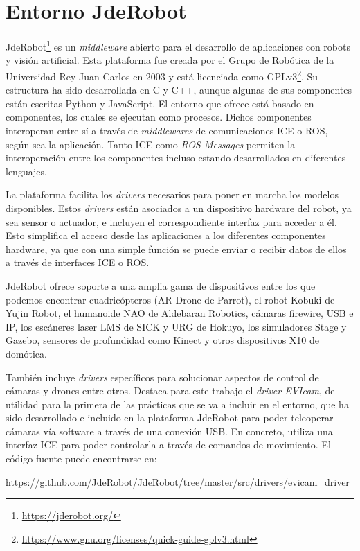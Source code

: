 \section{Entorno JdeRobot}
JdeRobot\footnote{\url{https://jderobot.org/}} es un \textit{middleware} abierto para el desarrollo de aplicaciones con robots y visión artificial. Esta plataforma fue creada por el Grupo de Robótica de la Universidad Rey Juan Carlos en 2003 y está licenciada como GPLv3\footnote{\url{https://www.gnu.org/licenses/quick-guide-gplv3.html}}.
Su estructura ha sido desarrollada en C y C++, aunque algunas de sus componentes están escritas Python y JavaScript. El entorno que ofrece está basado en componentes, los cuales se ejecutan como procesos. Dichos componentes interoperan entre sí a través de \textit{middlewares} de comunicaciones ICE o  ROS, según sea la aplicación. Tanto ICE como \textit{ROS-Messages} permiten la interoperación entre los componentes incluso estando desarrollados en diferentes lenguajes.

La plataforma facilita los \textit{drivers} necesarios para poner en marcha los modelos disponibles. Estos \textit{drivers} están asociados a un dispositivo hardware del robot, ya sea sensor o actuador, e incluyen el correspondiente interfaz para acceder a él. Esto simplifica el acceso desde las aplicaciones a los diferentes componentes hardware, ya que con una simple función se puede enviar o recibir datos de ellos a través de interfaces ICE o ROS.

JdeRobot ofrece soporte a una amplia gama de dispositivos entre los que podemos encontrar cuadricópteros (AR Drone de Parrot), el robot Kobuki de Yujin Robot, el humanoide NAO de Aldebaran Robotics, cámaras firewire, USB e IP, los escáneres laser LMS de SICK y URG de Hokuyo, los simuladores Stage y Gazebo, sensores de profundidad como Kinect y otros dispositivos X10 de domótica. 

También incluye \textit{drivers} específicos para solucionar aspectos de control de cámaras y drones entre otros. Destaca para este trabajo el \textit{driver EVIcam}, de utilidad para la primera de las prácticas que se va a incluir en el entorno, que ha sido desarrollado e incluido en la plataforma JdeRobot para poder teleoperar cámaras vía software a través de una conexión USB. En concreto, utiliza una interfaz ICE para poder controlarla a través de comandos de movimiento. 
El código fuente puede encontrarse en: 

\url{https://github.com/JdeRobot/JdeRobot/tree/master/src/drivers/evicam_driver}

